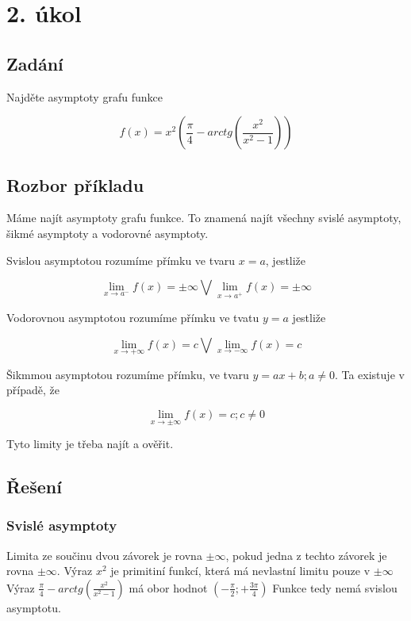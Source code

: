 \section{2. úkol}
\subsection{Zadání}

Najděte asymptoty grafu funkce 

\begin{displaymath}
f(x) = x^2(\frac{\pi}{4}-arctg(\frac{x^2}{x^2-1}))
\end{displaymath}

\subsection{Rozbor příkladu}

Máme najít asymptoty grafu funkce. To znamená najít všechny svislé asymptoty, šikmé asymptoty a vodorovné asymptoty.

Svislou asymptotou rozumíme přímku ve tvaru $x=a$, jestliže 

\begin{displaymath}
\lim_{x \to a^-} f(x) = \pm \infty \bigvee\lim_{x \to a^+} f(x) = \pm \infty
\end{displaymath}

Vodorovnou asymptotou rozumíme přímku ve tvatu $y=a$ jestliže

\begin{displaymath}
\lim_{x \to +\infty} f(x) = c \bigvee\lim_{x \to - \infty} f(x) = c
\end{displaymath}

Šikmmou asymptotou rozumíme přímku, ve tvaru $y=ax+b;a \neq 0$. Ta existuje v případě, že

\begin{displaymath}
\lim_{x \to \pm \infty} f(x) = c ;c \neq 0
\end{displaymath}

Tyto limity je třeba najít a ověřit.

\subsection{Řešení}

\subsubsection{Svislé asymptoty}
Limita ze součinu dvou závorek je rovna $ \pm \infty$, pokud jedna z techto závorek je rovna $\pm \infty$. Výraz $x^2$ je primitiní funkcí, která má nevlastní limitu pouze v $\pm \infty$ Výraz $\frac{\pi}{4}-arctg(\frac{x^2}{x^2-1})$ má obor hodnot $(-\frac{\pi}{2};+\frac{3\pi}{4})$ Funkce tedy nemá svislou asymptotu.
